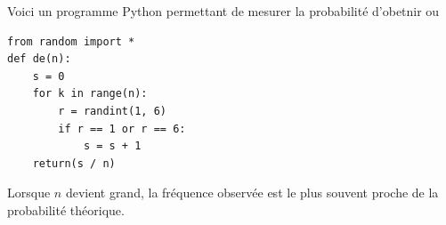 \begin{methode}
	Voici un programme Python permettant de mesurer la probabilité d'obetnir  ou 
	\begin{center}
		\begin{minipage}{0.5\linewidth}
			\begin{lstlisting}
from random import *
def de(n):
    s = 0
    for k in range(n):
        r = randint(1, 6)
        if r == 1 or r == 6:
            s = s + 1
    return(s / n)\end{lstlisting}
		\end{minipage}
	\end{center}
\end{methode}

\begin{demo}
	Lorsque $n$ devient grand, la fréquence observée est le plus souvent proche de la probabilité théorique.
\end{demo}
